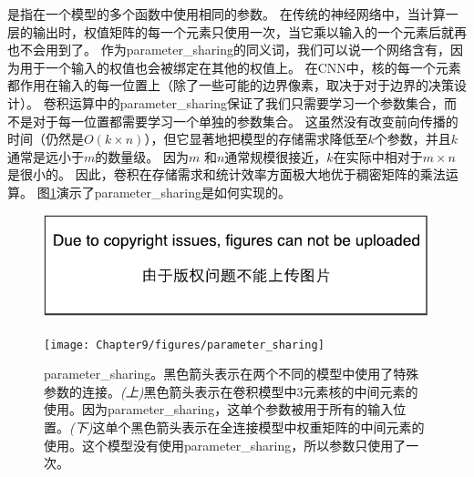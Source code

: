 是指在一个模型的多个函数中使用相同的参数。
在传统的神经网络中，当计算一层的输出时，权值矩阵的每一个元素只使用一次，当它乘以输入的一个元素后就再也不会用到了。
作为\gls{parameter_sharing}的同义词，我们可以说一个网络含有，因为用于一个输入的权值也会被绑定在其他的权值上。
在\gls{CNN}中，核的每一个元素都作用在输入的每一位置上（除了一些可能的边界像素，取决于对于边界的决策设计）。
卷积运算中的\gls{parameter_sharing}保证了我们只需要学习一个参数集合，而不是对于每一位置都需要学习一个单独的参数集合。
这虽然没有改变前向传播的时间（仍然是$O(k\times n)$），但它显著地把模型的存储需求降低至$k$个参数，并且$k$通常是远小于$m$的数量级。
因为$m$ 和$n$通常规模很接近，$k$在实际中相对于$m\times n$是很小的。
因此，卷积在存储需求和统计效率方面极大地优于稠密矩阵的乘法运算。
图\ref{fig:chap9_parameter_sharing}演示了\gls{parameter_sharing}是如何实现的。
\begin{figure}[!htb]
\ifOpenSource
\centerline{\includegraphics{figure.pdf}}
\else
\centerline{\texttt{[image: Chapter9/figures/parameter\_sharing]}}
\fi
\caption{\gls{parameter_sharing}。黑色箭头表示在两个不同的模型中使用了特殊参数的连接。\emph{(上)}黑色箭头表示在卷积模型中3元素核的中间元素的使用。因为\gls{parameter_sharing}，这单个参数被用于所有的输入位置。\emph{(下)}这单个黑色箭头表示在全连接模型中权重矩阵的中间元素的使用。这个模型没有使用\gls{parameter_sharing}，所以参数只使用了一次。}
\label{fig:chap9_parameter_sharing}
\end{figure}
 
 

